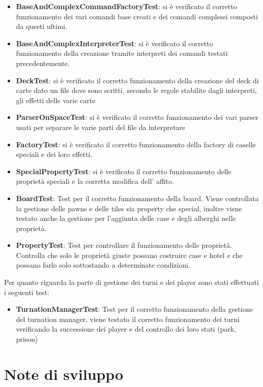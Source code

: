 \begin{itemize}
    \item \textbf{BaseAndComplexCommandFactoryTest}: si è verificato il corretto funzionamento dei vari comandi base creati e dei comandi complessi composti da questi ultimi.
    \item \textbf{BaseAndComplexInterpreterTest}: si è verificato il corretto funzionamento della creazione tramite interpreti dei comandi testati precedentemente.
    \item \textbf{DeckTest}: si è verificato il corretto funzionamento della creazione del deck di carte dato un file dove sono scritti, secondo le regole stabilite dagli interpreti, gli effetti delle varie carte
    \item \textbf{ParserOnSpaceTest}: si è verificato il corretto funzionamento dei vari parser usati per separare le varie parti del file da interpretare
    \item \textbf{FactoryTest}: si è verificato il corretto funzionamento della factory di caselle speciali e dei loro effetti. 
    \item \textbf{SpecialPropertyTest}: si è verificato il corretto funzionamento delle proprietà speciali e la corretta modifica dell' affito.
    \item \textbf{BoardTest}: Test per il corretto funzionamento della board. Viene controllata la gestione delle pawns e delle tiles sia property che special, inoltre viene testato anche la gestione per l'aggiunta delle case e degli alberghi nelle proprietà.
    \item \textbf{PropertyTest}: Test per controllare il funzionamento delle proprietà. Controlla che solo le proprietà giuste possano costruire case e hotel e che possano farlo solo sottostando a determinate condizioni.
\end{itemize}
Per quanto riguarda la parte di gestione dei turni e dei player sono stati effettuati i seguenti test:\newline
\begin{itemize}
    \item \textbf{TurnationManagerTest}: Test per il corretto funzionamento della gestione del turnation manager, viene testato il corretto funzionamento dei turni verificando la successione dei player e del controllo dei loro stati (park, prison)
\end{itemize}

\section{Note di sviluppo}